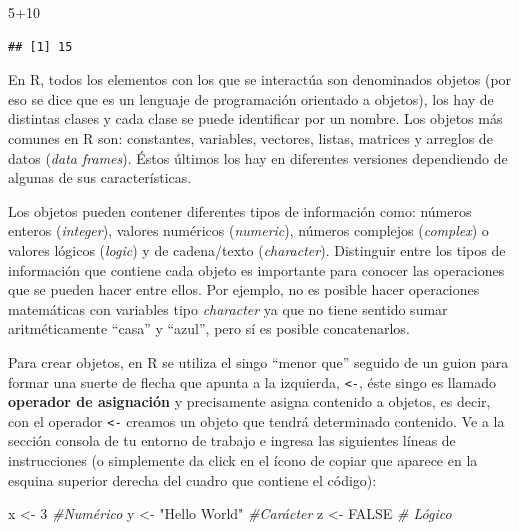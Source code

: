 \documentclass[
  11pt,
  oneside]{book}
\newenvironment{Shaded}{\begin{snugshade}}{\end{snugshade}}
\newcommand{\CommentTok}[1]{\textcolor[rgb]{0.56,0.35,0.01}{\textit{#1}}}
\newcommand{\ConstantTok}[1]{\textcolor[rgb]{0.00,0.00,0.00}{#1}}
\newcommand{\DecValTok}[1]{\textcolor[rgb]{0.00,0.00,0.81}{#1}}
\newcommand{\NormalTok}[1]{#1}
\newcommand{\OtherTok}[1]{\textcolor[rgb]{0.56,0.35,0.01}{#1}}
\newcommand{\SpecialCharTok}[1]{\textcolor[rgb]{0.00,0.00,0.00}{#1}}
\newcommand{\StringTok}[1]{\textcolor[rgb]{0.31,0.60,0.02}{#1}}
\begin{document}
\begin{Shaded}
\begin{Highlighting}[]
\DecValTok{5}\SpecialCharTok{+}\DecValTok{10}
\end{Highlighting}
\end{Shaded}

\begin{verbatim}
## [1] 15
\end{verbatim}

En R, todos los elementos con los que se interactúa son denominados objetos (por eso se dice que es un lenguaje de programación orientado a objetos), los hay de distintas clases y cada clase se puede identificar por un nombre. Los objetos más comunes en R son: constantes, variables, vectores, listas, matrices y arreglos de datos (\emph{data frames}). Éstos últimos los hay en diferentes versiones dependiendo de algunas de sus características.

Los objetos pueden contener diferentes tipos de información como: números enteros (\emph{integer}), valores numéricos (\emph{numeric}), números complejos (\emph{complex}) o valores lógicos (\emph{logic}) y de cadena/texto (\emph{character}). Distinguir entre los tipos de información que contiene cada objeto es importante para conocer las operaciones que se pueden hacer entre ellos. Por ejemplo, no es posible hacer operaciones matemáticas con variables tipo \emph{character} ya que no tiene sentido sumar aritméticamente ``casa'' y ``azul'', pero sí es posible concatenarlos.

Para crear objetos, en R se utiliza el singo ``menor que'' seguido de un guion para formar una suerte de flecha que apunta a la izquierda, \texttt{\textless{}-}, éste singo es llamado \textbf{operador de asignación} y precisamente asigna contenido a objetos, es decir, con el operador \texttt{\textless{}-} creamos un objeto que tendrá determinado contenido. Ve a la sección consola de tu entorno de trabajo e ingresa las siguientes líneas de instrucciones (o simplemente da click en el ícono de copiar que aparece en la esquina superior derecha del cuadro que contiene el código):

\begin{Shaded}
\begin{Highlighting}[]
\NormalTok{x }\OtherTok{\textless{}{-}} \DecValTok{3} \CommentTok{\#Numérico}
\NormalTok{y }\OtherTok{\textless{}{-}} \StringTok{"Hello World"} \CommentTok{\#Carácter }
\NormalTok{z }\OtherTok{\textless{}{-}} \ConstantTok{FALSE} \CommentTok{\# Lógico}
\end{Highlighting}
\end{Shaded}
\end{document}
